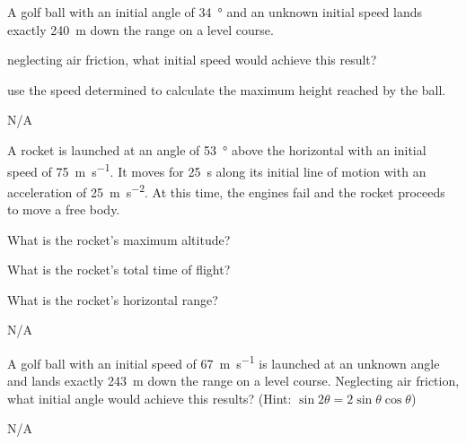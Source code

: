 


\begin{question}[ID=upwardly-A-Q01,topic=projectiles,difficulty=A]
    A golf ball with an initial angle of \SI{34}{\degree} and
        an unknown initial speed lands exactly \SI{240}{\meter}
        down the range on a level course.
    \begin{enumerate*}[label=\arabic*)]
        \item neglecting air friction, what initial speed
            would achieve this result?
        \item use the speed determined to calculate the
            maximum height reached by the ball.
    \end{enumerate*}
\end{question}
\begin{solution}
    N/A
\end{solution}


\begin{question}[ID=upwardly-A-Q02,topic=projectiles,difficulty=A]
    A rocket is launched at an angle of \SI{53}{\degree} above
        the horizontal with an initial speed of
        \SI{75}{\meter\per\second}.
    It moves for \SI{25}{\second} along its initial line
        of motion with an acceleration of
        \SI{25}{\meter\per\second\squared}.
    At this time, the engines fail and the rocket proceeds to move
        a free body.
    \begin{enumerate*}[label=\arabic*)]
        \item What is the rocket's maximum altitude?
        \item What is the rocket's total time of flight?
        \item What is the rocket's horizontal range?
    \end{enumerate*}
\end{question}
\begin{solution}
    N/A
\end{solution}


\begin{question}[ID=upwardly-A-Q03,topic=projectiles,difficulty=A]
    A golf ball with an initial speed of \SI{67}{\meter\per\second}
        is launched at an unknown angle and lands exactly
        \SI{243}{\meter} down the range on a level course.
    Neglecting air friction, what initial angle would
        achieve this results?
    (Hint: $\sin{2\theta} = 2\sin{\theta}\cos{\theta}$)
\end{question}
\begin{solution}
    N/A
\end{solution}


